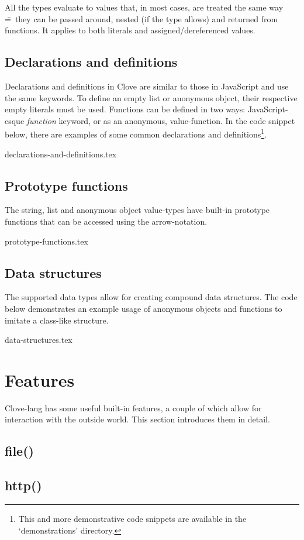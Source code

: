 \documentclass[12pt,a4paper]{article}
\begin{document}
All the types evaluate to values that, in most cases, are treated the same way \==~they can be passed around, nested (if the type allows) and returned from functions. It applies to both literals and assigned/dereferenced values.



\subsection*{Declarations and definitions}
Declarations and definitions in Clove are similar to those in JavaScript and use the same keywords. To define an empty list or anonymous object, their respective empty literals must be used. Functions can be defined in two ways: JavaScript-esque \emph{function} keyword, or as an anonymous, value-function. In the code snippet below, there are examples of some common declarations and definitions\footnote{This and more demonstrative code snippets are available in the `demonstrations' directory.}.

{declarations-and-definitions.tex}



\subsection*{Prototype functions}
The string, list and anonymous object value-types have built-in prototype functions that can be accessed using the arrow-notation.

{prototype-functions.tex}



\subsection*{Data structures}
The supported data types allow for creating compound data structures. The code below demonstrates an example usage of anonymous objects and functions to imitate a class-like structure.

{data-structures.tex}









\section*{Features}
Clove-lang has some useful built-in features, a couple of which allow for interaction with the outside world. This section introduces them in detail.


\subsection*{file()}


\subsection*{http()}
\end{document}
